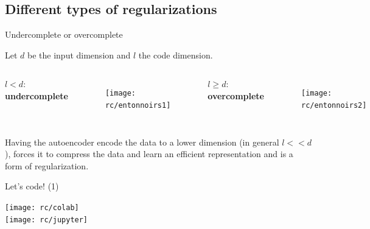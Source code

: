 \documentclass{beamer}
\begin{document}
  \subsection{Different types of regularizations}

  \begin{frame}{Undercomplete or overcomplete}

    Let $d$ be the input dimension and $l$ the code dimension.
    \vspace{0.5cm}
    \begin{columns}[T,onlytextwidth]
      \centering
      $l < d$: \textbf{undercomplete}
      \begin{figure}
        \texttt{[image: rc/entonnoirs1]}
      \end{figure}
      \centering
      $l \geq d$: \textbf{overcomplete}
      \begin{figure}
        \texttt{[image: rc/entonnoirs2]}
      \end{figure}
      
    \end{columns}
    \vspace{0.5cm}
    Having the autoencoder encode the data to a lower dimension (in general $l << d$), forces it to compress the data and learn an efficient representation and is a \alert{form of regularization}.
    
  \end{frame}

  \begin{frame}{Let's code! (1)}

    \centering
    \texttt{[image: rc/colab]}\\
    \vspace{1cm}
    \texttt{[image: rc/jupyter]}


    
  \end{frame}
\end{document}
